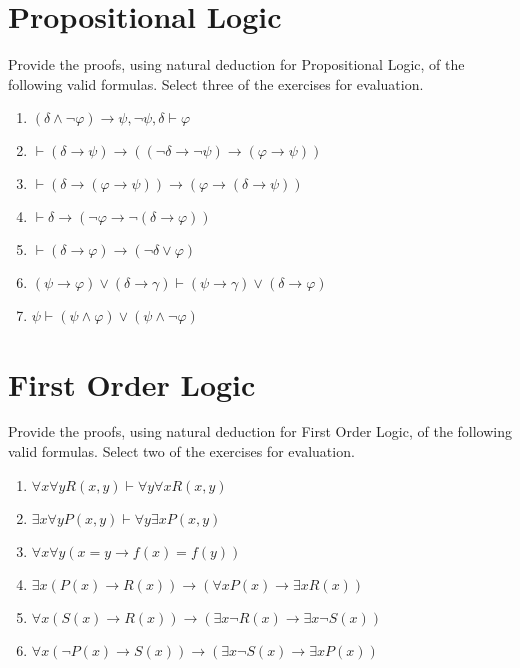 \documentclass[11pt]{article}
\begin{document}
\section{Propositional Logic}

\begin{myExercise}
  Provide the proofs, using natural deduction for Propositional Logic, of the following valid formulas. Select three of the exercises for evaluation.
  
  \begin{enumerate}[label=(\alph*)]
    \item $(\delta \land \neg\varphi) \to \psi, \neg\psi, \delta \vdash \varphi$
    \item $\vdash (\delta \to \psi) \to ((\neg\delta \to \neg\psi) \to (\varphi \to \psi))$
    \item $\vdash (\delta \to (\varphi \to \psi)) \to (\varphi \to (\delta \to \psi))$
    \item $\vdash \delta \to (\neg\varphi \to \neg(\delta \to \varphi))$
    \item $\vdash (\delta \to \varphi) \to (\neg\delta \lor \varphi)$
    \item $(\psi \to \varphi) \lor (\delta \to \gamma) \vdash (\psi \to \gamma) \lor (\delta \to \varphi)$
    \item $\psi \vdash (\psi \land \varphi) \lor (\psi \land \neg\varphi)$

  \end{enumerate}

\end{myExercise}

\section{First Order Logic}

\begin{myExercise}
 Provide the proofs, using natural deduction for First Order Logic, of the following valid formulas. Select two of the exercises for evaluation.
  
  \begin{enumerate}[label=(\alph*)]
    \item $\forall x \forall y R(x,y) \vdash \forall y\forall x R(x,y)$
    \item $\exists x\forall y P(x,y) \vdash \forall y\exists x P(x,y)$
    \item $\forall x\forall y (x = y \to f(x) = f(y))$
    \item $\exists x (P(x) \to R(x)) \to (\forall x P(x) \to \exists x R(x))$
    \item $\forall x(S(x) \to R(x)) \to (\exists x\neg R(x) \to \exists x\neg S(x))$
    \item $\forall x (\neg P(x) \to S(x)) \to (\exists x \neg S(x) \to \exists x P(x))$

  \end{enumerate}

\end{myExercise}
 
\end{document}
